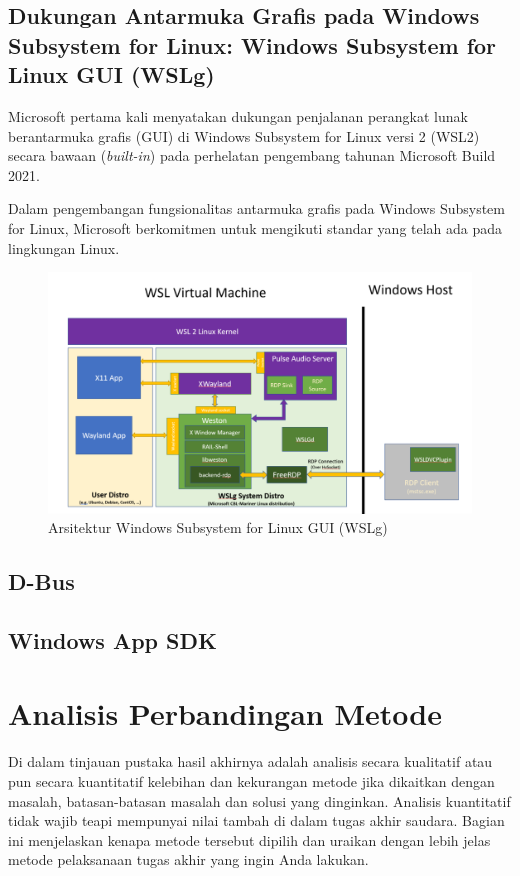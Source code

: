 \subsection{Dukungan Antarmuka Grafis pada Windows Subsystem for Linux: Windows Subsystem for Linux GUI (WSLg)}

Microsoft pertama kali menyatakan dukungan penjalanan perangkat lunak berantarmuka grafis (GUI) di Windows Subsystem for Linux versi 2 (WSL2) secara bawaan (\textit{built-in}) pada perhelatan pengembang tahunan Microsoft Build 2021.

Dalam pengembangan fungsionalitas antarmuka grafis pada Windows Subsystem for Linux, Microsoft berkomitmen untuk mengikuti standar yang telah ada pada lingkungan Linux.

\begin{figure}
    \centering
    \includegraphics[width=0.5\linewidth]{wslg-architecture.png}
    \caption{Arsitektur Windows Subsystem for Linux GUI (WSLg)}
    \label{fig:enter-label}
\end{figure}


\subsection{D-Bus}

\subsection{Windows App SDK}

\section{Analisis Perbandingan Metode}

Di dalam tinjauan pustaka hasil akhirnya adalah analisis secara kualitatif atau pun secara kuantitatif kelebihan dan kekurangan metode jika dikaitkan dengan masalah, batasan-batasan masalah dan solusi yang dinginkan. Analisis kuantitatif tidak wajib teapi mempunyai nilai tambah di dalam tugas akhir saudara. Bagian ini menjelaskan kenapa metode tersebut dipilih dan uraikan dengan lebih jelas metode pelaksanaan tugas akhir yang ingin Anda lakukan. 

